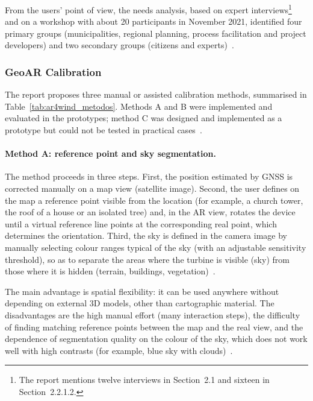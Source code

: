 From the users' point of view, the needs analysis, based on expert interviews\footnote{The report mentions twelve interviews in Section~2.1 and sixteen in Section~2.2.1.2.} and on a workshop with about 20 participants in November 2021, identified four primary groups (municipalities, regional planning, process facilitation and project developers) and two secondary groups (citizens and experts)~\cite[Sec.~2.1 and 2.2.1.2]{ar4wind2023}.

\subsubsection{GeoAR Calibration}
\label{sec:ar4wind_calibracao}

The report proposes three manual or assisted calibration methods, summarised in Table~\ref{tab:ar4wind_metodos}. Methods A and B were implemented and evaluated in the prototypes; method C was designed and implemented as a prototype but could not be tested in practical cases~\cite[Sec.~2.2.2.4]{ar4wind2023}.

\paragraph{Method A: reference point and sky segmentation.}
\label{sec:ar4wind_metodoA}
The method proceeds in three steps. First, the position estimated by GNSS is corrected manually on a map view (satellite image). Second, the user defines on the map a reference point visible from the location (for example, a church tower, the roof of a house or an isolated tree) and, in the AR view, rotates the device until a virtual reference line points at the corresponding real point, which determines the orientation. Third, the sky is defined in the camera image by manually selecting colour ranges typical of the sky (with an adjustable sensitivity threshold), so as to separate the areas where the turbine is visible (sky) from those where it is hidden (terrain, buildings, vegetation)~\cite[Sec.~2.2.2.2 and 2.2.3.1]{ar4wind2023}.

The main advantage is spatial flexibility: it can be used anywhere without depending on external 3D models, other than cartographic material. The disadvantages are the high manual effort (many interaction steps), the difficulty of finding matching reference points between the map and the real view, and the dependence of segmentation quality on the colour of the sky, which does not work well with high contrasts (for example, blue sky with clouds)~\cite[Sec.~2.2.2.2]{ar4wind2023}.

